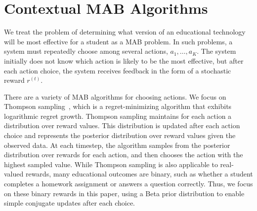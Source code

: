 \section{Contextual MAB Algorithms}

We treat the problem of determining what version of an educational technology will be most effective for a student as a MAB problem. In such problems, a system must repeatedly choose among several actions, $a_{1},\ldots,a_{K}$. The system initially does not know which action is likely to be the most effective, but after each action choice, the system receives feedback in the form of a stochastic reward $r^{(t)}$. 

There are a variety of MAB algorithms for choosing actions. We focus on Thompson sampling~\cite{agrawal2012Analysis}, which is a regret-minimizing algorithm that exhibits logarithmic regret growth. 
Thompson sampling maintains for each action a distribution over reward values. This distribution is updated after each action choice and represents the posterior distribution over reward values given the observed data.
At each timestep, the algorithm samples from the posterior distribution over rewards for each action, and then chooses the action with the highest sampled value.
While Thompson sampling is also applicable to real-valued rewards, many educational outcomes are binary, such as whether a student completes a homework assignment or answers a question correctly. Thus, we focus on these binary rewards in this paper, using a Beta prior distribution to enable simple conjugate updates after each choice. 


